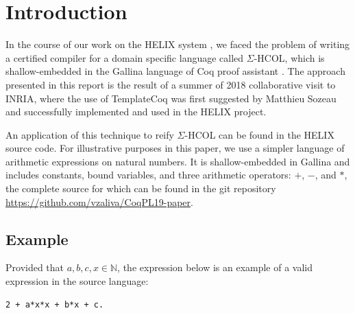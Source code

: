 \documentclass[sigplan]{acmart}\settopmatter{printfolios=true,printccs=false,printacmref=false}
\newcommand{\N}{\mathbb{N}}
\begin{document}


\maketitle

\section{Introduction}

In the course of our work on the HELIX system \cite{helixFHPC18}, we faced
the problem of writing a certified compiler for a domain specific
language called $\Sigma$-HCOL, which is shallow-embedded in the Gallina
language of Coq proof assistant \cite{Coq}. The approach presented in
this report is the result of a summer of 2018 collaborative visit to INRIA,
where the use of TemplateCoq \cite{anand2018towards} was first suggested by
Matthieu Sozeau and successfully implemented and used in the HELIX
project.

An application of this technique to reify $\Sigma$-HCOL can be found
in the HELIX source code. For illustrative purposes in this paper, we use a simpler language of arithmetic expressions on natural
numbers. It is shallow-embedded in Gallina and includes constants,
bound variables, and three arithmetic operators: $+$, $-$, and
$*$, the complete source for which can be found in the git repository
\url{https://github.com/vzaliva/CoqPL19-paper}.

\subsection{Example}

Provided that $a, b, c, x \in \N$, the expression below is an example of a valid
expression in the source language:

\begin{lstlisting}[language=Coq, mathescape=true,
  basicstyle=\footnotesize,
  caption=Expression in source language,
  label=lst:sexp]
            2 + a*x*x + b*x + c.
\end{lstlisting}
\end{document}
